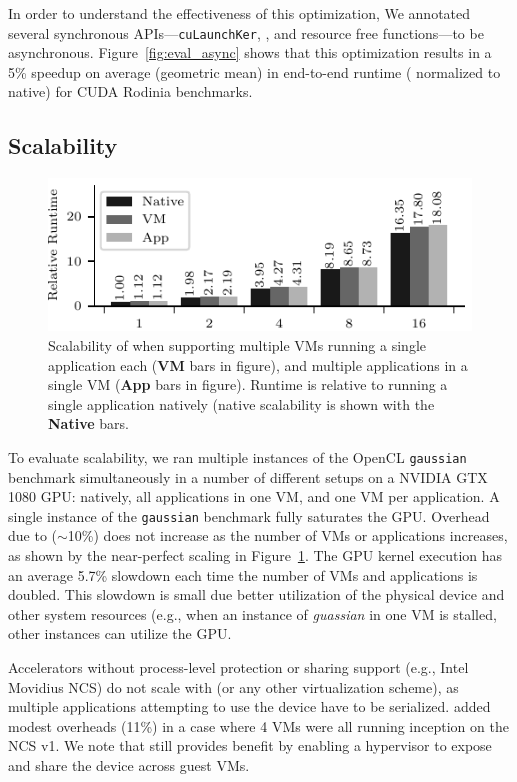 In order to understand the effectiveness of this optimization, We annotated
several synchronous APIs---\lstinline[breaklines=true,escapechar=|]@cuLaunchKer@\-\lstinline@nel@, \lstinline@cuMemcpyHtoD@, and resource free functions---to
be asynchronous. Figure~\ref{fig:eval_async} shows that this optimization
results in a 5\% speedup on average (geometric mean) in end-to-end runtime (
normalized to native) for CUDA Rodinia benchmarks.

\subsection{Scalability}
\begin{figure}[!th]
	\centering
	\includegraphics[width=.7\linewidth]{ava/data/scalability/scalability.pdf}%
	\caption{Scalability of \ava when supporting multiple VMs running a single application each (\textbf{VM} bars in figure), and multiple applications in a single VM (\textbf{App} bars in figure). Runtime is relative to running a single application natively (native scalability is shown with the \textbf{Native} bars.}
	\label{fig:scalability}
\end{figure}

To evaluate scalability, we ran multiple instances of the OpenCL
\texttt{gaussian} benchmark simultaneously in a number of different setups on a
NVIDIA GTX 1080 GPU: natively, all applications in one VM, and one VM per
application. A single instance of the \texttt{gaussian} benchmark fully
saturates the GPU. Overhead due to \AvA ($\sim$10\%) does not increase as the
number of VMs or applications increases, as shown by the near-perfect scaling
in Figure~\ref{fig:scalability}. The GPU kernel execution has an average 5.7\%
slowdown each time the number of VMs and applications is doubled. This
slowdown is small due better utilization of the physical device and other
system resources (e.g., when an instance of \textit{guassian} in one VM is
stalled, other instances can utilize the GPU.

Accelerators without process-level protection or sharing support (e.g., Intel
Movidius NCS) do not scale with \AvA (or any other virtualization scheme), as
multiple applications attempting to use the device have to be serialized.
\AvA added modest overheads (11\%) in a case where 4 VMs were all running
inception on the NCS v1. We note that \AvA still provides benefit by enabling
a hypervisor to expose and share the device across guest VMs.

